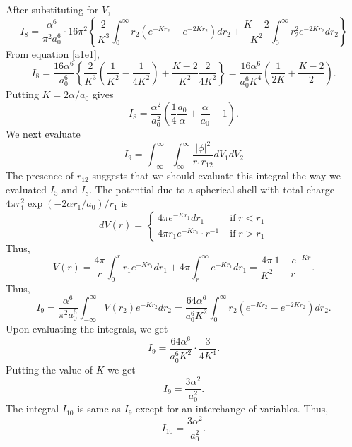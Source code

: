 \documentclass{article}
\numberwithin{equation}{section}
\begin{document}
After substituting for $V$,
\[
I_8 = \frac{\alpha^6}{\pi^2 a_0^6} \cdot 16\pi^2 \left\{
\frac{2}{K^3}\int_0^\infty r_2(e^{-Kr_2} - e^{-2Kr_2})dr_2 + 
\frac{K-2}{K^2}\int_0^\infty r_2^2 e^{-2Kr_2}dr_2\right\}
\]
From equation \eqref{a1e1},
\[
I_8 = \frac{16\alpha^6}{a_0^6}\left\{\frac{2}{K^3}\left(\frac{1}{K^2} -
    \frac{1}{4K^2}\right) + \frac{K-2}{K^2}\frac{2}{4K^2}\right\}
 = \frac{16\alpha^6}{a_0^6K^4}\left(\frac{1}{2K} + \frac{K-2}{2}\right).
\]
Putting $K = 2\alpha/a_0$ gives
\begin{equation}\label{s5e82}
I_8 = \frac{\alpha^2}{a_0^2}\left(\frac{1}{4}\frac{a_0}{\alpha} + 
      \frac{\alpha}{a_0} - 1\right).
\end{equation}
We next evaluate
\[
I_9 = \int_{-\infty}^\infty\int_{\infty}^\infty \frac{|\phi|^2}{r_1r_{12}}
dV_1dV_2
\]
The presence of $r_{12}$ suggests that we should evaluate this integral 
the way we evaluated $I_5$ and $I_8$. The potential due to a spherical
shell with total charge $4\pi r_1^2\exp(-2\alpha r_1/a_0)/r_1$ is
\[
dV(r) = \begin{cases}
4\pi e^{-Kr_1}dr_1 & \;\text{if}\; r < r_1 \\
4\pi r_1 e^{-Kr_1}\cdot r^{-1} & \;\text{if}\; r > r_1
\end{cases}
\]
Thus,
\[
V(r) = \frac{4\pi}{r}\int_0^r r_1e^{-Kr_1}dr_1 + 
4\pi\int_r^\infty e^{-Kr_1}dr_1 = \frac{4\pi}{K^2}\frac{1 - e^{-Kr}}{r}.
\]
Thus,
\[
I_9 = \frac{\alpha^6}{\pi^2 a_0^6}
\int_{-\infty}^\infty V(r_2)e^{-Kr_2}dr_2 = \frac{64\alpha^6}{a_0^6K^2}
\int_0^\infty r_2(e^{-Kr_2} - e^{-2Kr_2})dr_2.
\]
Upon evaluating the integrals, we get
\[
I_9 = \frac{64\alpha^6}{a_0^6K^2}\cdot\frac{3}{4K^4}.
\]
Putting the value of $K$ we get
\begin{equation}\label{s5e83}
I_9 = \frac{3\alpha^2}{a_0^2}.
\end{equation}
The integral $I_{10}$ is same as $I_9$ except for an interchange of
variables. Thus,
\begin{equation}\label{s5e84}
I_{10} = \frac{3\alpha^2}{a_0^2}.
\end{equation}
\end{document}

